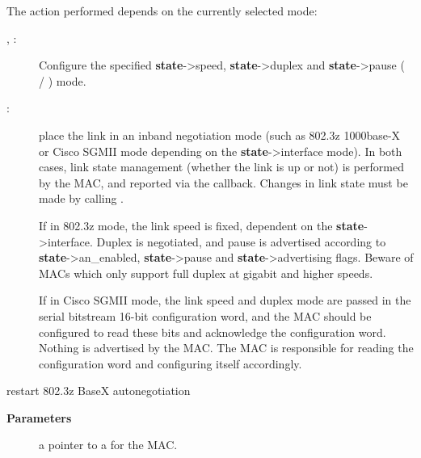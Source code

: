 \documentclass[a4paper,8pt,english]{sphinxmanual}
\begin{document}
The action performed depends on the currently selected mode:
\begin{description}
\item[{, :}] \leavevmode
Configure the specified \textbf{state}-\textgreater{}speed, \textbf{state}-\textgreater{}duplex and
\textbf{state}-\textgreater{}pause ( / ) mode.

\item[{:}] \leavevmode
place the link in an inband negotiation mode (such as 802.3z
1000base-X or Cisco SGMII mode depending on the \textbf{state}-\textgreater{}interface
mode). In both cases, link state management (whether the link
is up or not) is performed by the MAC, and reported via the
{\hyperref[networking/kapi:c.mac_link_state]{\emph{}}} callback. Changes in link state must be made
by calling {\hyperref[networking/kapi:c.phylink_mac_change]{\emph{}}}.

If in 802.3z mode, the link speed is fixed, dependent on the
\textbf{state}-\textgreater{}interface. Duplex is negotiated, and pause is advertised
according to \textbf{state}-\textgreater{}an\_enabled, \textbf{state}-\textgreater{}pause and
\textbf{state}-\textgreater{}advertising flags. Beware of MACs which only support full
duplex at gigabit and higher speeds.

If in Cisco SGMII mode, the link speed and duplex mode are passed
in the serial bitstream 16-bit configuration word, and the MAC
should be configured to read these bits and acknowledge the
configuration word. Nothing is advertised by the MAC. The MAC is
responsible for reading the configuration word and configuring
itself accordingly.

\end{description}

\begin{fulllineitems}
\label{networking/kapi:c.mac_an_restart}
restart 802.3z BaseX autonegotiation

\end{fulllineitems}


\textbf{Parameters}
\begin{description}
\item[{}] \leavevmode
a pointer to a {\hyperref[networking/kapi:c.net_device]{\emph{}}} for the MAC.

\end{description}
\end{document}

